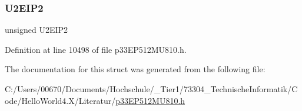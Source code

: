 \subsubsection{\texorpdfstring{U2\+E\+I\+P2}{U2EIP2}}
{\footnotesize\ttfamily unsigned U2\+E\+I\+P2}



Definition at line 10498 of file p33\+E\+P512\+M\+U810.\+h.



The documentation for this struct was generated from the following file\+:\begin{DoxyCompactItemize}
\item 
C\+:/\+Users/00670/\+Documents/\+Hochschule/\+\_\+\+Tier1/73304\+\_\+\+Technische\+Informatik/\+Code/\+Hello\+World4.\+X/\+Literatur/\hyperlink{p33_e_p512_m_u810_8h}{p33\+E\+P512\+M\+U810.\+h}\end{DoxyCompactItemize}
